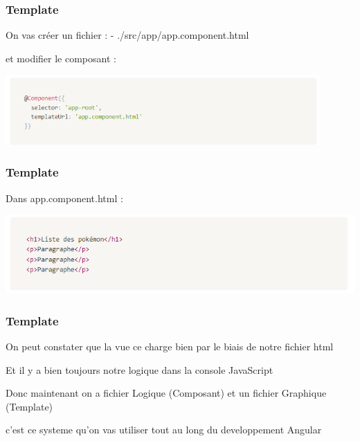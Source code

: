 \documentclass[10pt]{beamer}
\begin{document}
	\begin{frame}
		\frametitle{Template}

		On vas créer un fichier : \newline
		- ./src/app/app.component.html \newline \newline

		et modifier le composant : \newline


		\centering
		\includegraphics[width=12cm]{assets/templateAsset} \newline

	\end{frame}

	\begin{frame}
		\frametitle{Template}

		Dans app.component.html : \newline

		\centering
		\includegraphics[width=14cm]{assets/templateHtml} \newline

	\end{frame}

	\begin{frame}
		\frametitle{Template}

		On peut constater que la vue ce charge bien par le biais de notre fichier html \newline \newline

		Et il y a bien toujours notre logique dans la console JavaScript  \newline \newline

		Donc maintenant on a fichier \alert{Logique} (Composant) et un fichier \alert{Graphique} (Template) \newline \newline

		c’est ce systeme qu’on vas utiliser tout au long du developpement Angular

	\end{frame}
\end{document}

